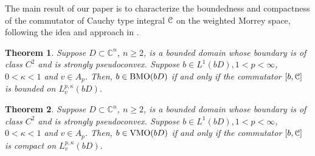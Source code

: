 \documentclass[11pt,a4paper]{amsart}
\numberwithin{equation}{section}
\newtheorem{theorem}{Theorem}[section]
\begin{document}
The main result of our paper is to characterize the boundedness and compactness of  the commutator of Cauchy type integral  $\EuScript C$ on the weighted Morrey space, following the idea and approach in \cite{DLLWW}.






\begin{theorem}\label{cauchy}
Suppose $D\subset \mathbb C^n$, $n\geq 2$, is  a bounded domain whose boundary is of class $C^2$ and is strongly pseudoconvex.
Suppose $b\in L^1(bD),1<p<\infty$, $0<\kappa<1$ and $v\in A_p$. Then,
 $b\in{\rm BMO}(bD)$ if and only if the commutator $[b, \EuScript C]$ is bounded on  $L_{v}^{p,\kappa}(bD)$.
\end{theorem}




\begin{theorem}\label{vmo}
Suppose $D\subset \mathbb C^n$, $n\geq 2$, is  a bounded domain whose boundary is of class $C^2$ and is strongly pseudoconvex.
Suppose $b\in L^1(bD),1<p<\infty$, $0<\kappa<1$ and $v\in A_p$. Then,
 $b\in{\rm VMO}(bD)$ if and only if the commutator $[b, \EuScript C]$ is compact on  $L_{v}^{p,\kappa}(bD)$.
\end{theorem}
\end{document}
